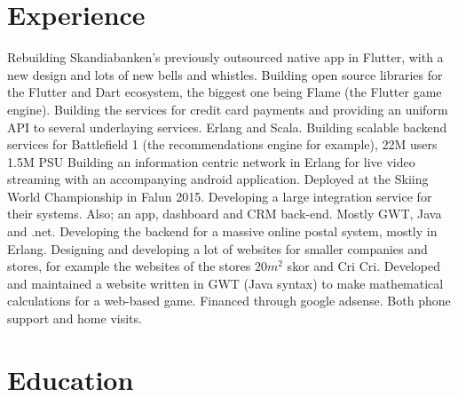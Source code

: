 \documentclass[11pt,a4paper]{moderncv}
\begin{document}
\section{\textbf{Experience}}
{Rebuilding Skandiabanken's previously outsourced native app in Flutter, with a new design and lots of new bells and whistles.}
{Building open source libraries for the Flutter and Dart ecosystem, the biggest one being Flame (the Flutter game engine).}
{Building the services for credit card payments and providing an uniform API to several underlaying services. Erlang and Scala.}
{Building scalable backend services for Battlefield 1 (the recommendations engine for example), 22M users 1.5M PSU}
{Building an information centric network in Erlang for live video streaming with an accompanying android application.
Deployed at the Skiing World Championship in Falun 2015.}
{Developing a large integration service for their systems. Also; an app, dashboard and CRM back-end. Mostly GWT, Java and .net.}
{Developing the backend for a massive online postal system, mostly in Erlang.}
{Designing and developing a lot of websites for smaller companies and stores, for example the websites of the stores \begin{math}20m^2\end{math} skor and Cri Cri.}
{Developed and maintained a website written in GWT (Java syntax) to make mathematical calculations for a web-based game. Financed through google adsense.}
{Both phone support and home visits.}
\newpage

\section{\textbf{Education}}
\end{document}
